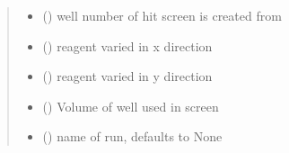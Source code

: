 \documentclass[letterpaper,10pt,english]{sphinxmanual}
\begin{document}
\begin{fulllineitems}
\begin{fulllineitems}
\begin{quote}
\begin{description}
\begin{itemize}
\item {} 
 () \textendash{} well number of hit screen is created from

\item {} 
 ({\hyperref[\detokenize{polo.crystallography:polo.crystallography.cocktail.Reagent}]{}}) \textendash{} reagent varied in x direction

\item {} 
 ({\hyperref[\detokenize{polo.crystallography:polo.crystallography.cocktail.Reagent}]{}}) \textendash{} reagent varied in y direction

\item {} 
 () \textendash{} Volume of well used in screen

\item {} 
 (\sphinxstyleliteralemphasis{\sphinxupquote{, }}) \textendash{} name of run, defaults to None

\end{itemize}

\end{description}\end{quote}

\end{fulllineitems}


\end{fulllineitems}

\end{document}
